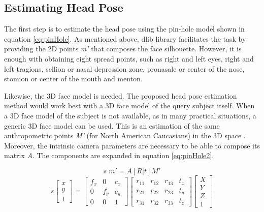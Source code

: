 \documentclass{sig-alternate}
\begin{document}
\subsection{Estimating Head Pose}
The first step is to estimate the head pose using the pin-hole model shown in equation \ref{eq:pinHole}. As mentioned above, dlib library facilitates the task by providing the 2D points \textit{m'} that composes the face silhouette. However, it is enough with obtaining eight spread points, such as right and left eyes, right and left tragions, sellion or nasal depression zone, pronasale or center of the nose, stomion or center of the mouth and menton.

Likewise, the 3D face model is needed. The proposed head pose estimation method would work best with a 3D face model of the query subject itself. When a 3D face model of the subject is not available, as in many practical situations, a generic 3D face model can be used. This is an estimation of the same anthropometric points \textit{M'} (for North American Caucasians) in the 3D space \cite{farkas1994anthropometry}. Moreover, the intrinsic camera parameters are necessary to be able to compose its matrix \textit{A}. The components are expanded in equation \ref{eq:pinHole2}.	

\begin{equation}
s  \; m' = A [R|t] M'
\label{eq:pinHole}
\end{equation}
\begin{equation}
s
\begin{bmatrix}
x \\
y \\
1
\end{bmatrix}
=
\begin{bmatrix}
f_x & 0 & c_x  \\
0 & f_y & c_y  \\
0 & 0 & 1 
\end{bmatrix}
\begin{bmatrix}
r_{11} & r_{12} & r_{13} & t_x  \\
r_{21} & r_{22} & r_{23} & t_y  \\
r_{31} & r_{32} & r_{33} & t_z  
\end{bmatrix}
\begin{bmatrix}
X \\
Y \\
Z \\
1
\end{bmatrix}
\label{eq:pinHole2}
\end{equation}
\end{document}
